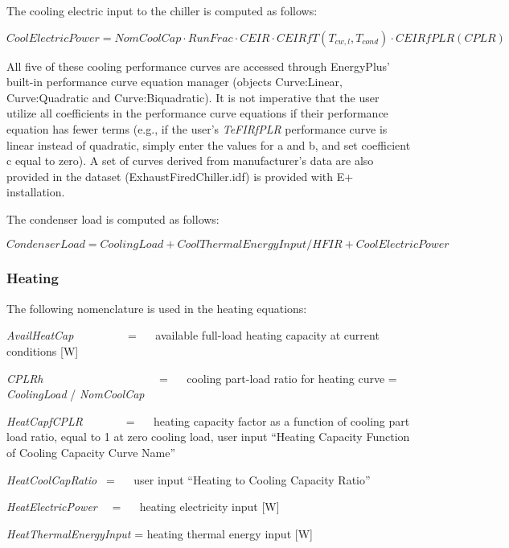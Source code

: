 The cooling electric input to the chiller is computed as follows:

\begin{equation}
CoolElectricPower = NomCoolCap \cdot RunFrac \cdot CEIR \cdot CEIRfT\left( {{T_{cw,l}},{T_{cond}}} \right) \cdot CEIRfPLR(CPLR)
\end{equation}

All five of these cooling performance curves are accessed through EnergyPlus' built-in performance curve equation manager (objects Curve:Linear, Curve:Quadratic and Curve:Biquadratic). It is not imperative that the user utilize all coefficients in the performance curve equations if their performance equation has fewer terms (e.g., if the user's \emph{TeFIRfPLR} performance curve is linear instead of quadratic, simply enter the values for a and b, and set coefficient c equal to zero). A set of curves derived from manufacturer's data are also provided in the dataset (ExhaustFiredChiller.idf) is provided with E+ installation.

The condenser load is computed as follows:

\begin{equation}
CondenserLoad = CoolingLoad + CoolThermalEnergyInput/HFIR + CoolElectricPower
\end{equation}

\subsubsection{Heating}\label{heating-1}

The following nomenclature is used in the heating equations:

\emph{AvailHeatCap}~~~~~~~~~ = ~~ available full-load heating capacity at current conditions {[}W{]}

\emph{CPLRh}~~~~~~~~~~~~~~~~~~~~ = ~~ cooling part-load ratio for heating curve = \emph{CoolingLoad} / \emph{NomCoolCap}

\emph{HeatCapfCPLR}~~~~~~~ = ~~ heating capacity factor as a function of cooling part load ratio, equal to 1 at zero cooling load, user input ``Heating Capacity Function of Cooling Capacity Curve Name''

\emph{HeatCoolCapRatio~} = ~~ user input ``Heating to Cooling Capacity Ratio''

\emph{HeatElectricPower}~~ = ~~ heating electricity input {[}W{]}

\emph{HeatThermalEnergyInput} = heating thermal energy input {[}W{]}

